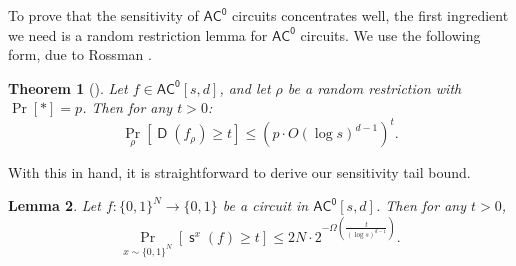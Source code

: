 \documentclass[10pt,a4paper]{article}
\newtheorem{theorem}{Theorem}
\newtheorem{lemma}[theorem]{Lemma}
\DeclareMathOperator{\D}{\mathsf{D}}
\DeclareMathOperator{\s}{\mathsf{s}}
\begin{document}
To prove that the sensitivity of $\mathsf{AC^0}$ circuits concentrates well, the first ingredient we need is a random restriction lemma for $\mathsf{AC^0}$ circuits. We use the following form, due to Rossman \cite{Ros17}.

\begin{theorem}[{\cite{Ros17}}]
\label{thm:rossman_ac0_restriction}
Let $f \in \mathsf{AC^0}[s, d]$, and let $\rho$ be a random restriction with $\Pr[*] = p$. Then for any $t > 0$:
\[
\Pr_\rho\left[\D(f_\rho) \ge t \right] \le \left(p \cdot O\left(\log s\right)^{d-1}\right)^t.
\]
\end{theorem}

With this in hand, it is straightforward to derive our sensitivity tail bound.

\begin{lemma}
\label{lem:ac0_sensitivity_tail_bound}
Let $f: \{0,1\}^N \to \{0,1\}$ be a circuit in $\mathsf{AC^0}[s, d]$. Then for any $t > 0$,
\[
\Pr_{x \sim \{0,1\}^N} \left[ \s^x(f) \ge t \right] \le 2N\cdot 2^{-\Omega\left(\frac{t}{(\log s)^{d-1}}\right)}.
\]
\end{lemma}
\end{document}
